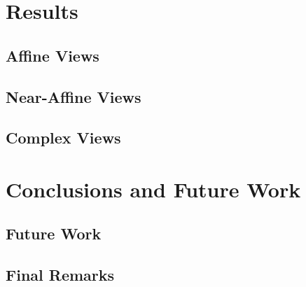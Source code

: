 \documentclass[11pt]{report}
\begin{document}
\begin{doublespace}
\chapter{Results}
\label{Ch:Results}

\indent


\section{Affine Views}

\indent



\newpage
\section{Near-Affine Views}

\indent



\newpage
\section{Complex Views}

\indent





\chapter{Conclusions and Future Work}
\label{Ch:Conclusion}

\indent


\section{Future Work}

\indent


\section{Final Remarks}

\indent



\end{doublespace}

\begin{singlespace}
	
	\nocite{*}
\end{singlespace}


\end{document}
